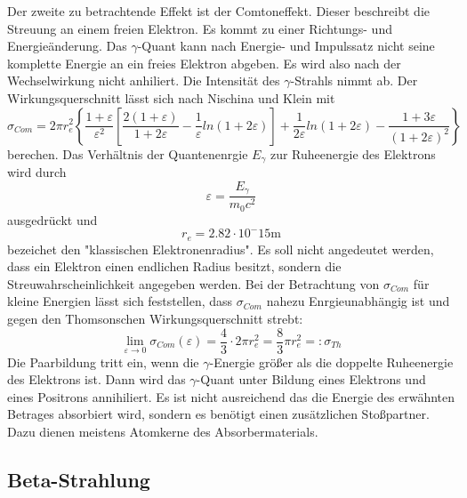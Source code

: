 Der zweite zu betrachtende Effekt ist der Comtoneffekt.
Dieser beschreibt die Streuung an einem freien Elektron.
Es kommt zu einer Richtungs- und Energieänderung.
Das $\gamma$-Quant kann nach Energie- und Impulssatz nicht seine komplette Energie an ein freies Elektron abgeben.
Es wird also nach der Wechselwirkung nicht anhiliert.
Die Intensität des $\gamma$-Strahls nimmt ab.
Der Wirkungsquerschnitt lässt sich nach Nischina und Klein mit
\begin{equation}
  \sigma_{Com} = 2 \pi r_e^2 \left\{\frac{1+\varepsilon}{\varepsilon^2}\left[\frac{2(1+\varepsilon)}{1+2\varepsilon} - \frac{1}{\varepsilon}ln(1+2\varepsilon)\right] + \frac{1}{2\varepsilon}ln(1+2\varepsilon) - \frac{1+3\varepsilon}{(1+2\varepsilon)^2} \right\}
\end{equation}
berechen.
Das Verhältnis der Quantenenrgie $E_\gamma$ zur Ruheenergie des Elektrons wird durch
\begin{equation}
  \varepsilon = \frac{E_\gamma}{m_0 c^2}
\end{equation}
ausgedrückt und
\begin{equation}
  r_e= 2.82 \cdot 10^-15 \si{\meter}
\end{equation}
bezeichet den "klassischen Elektronenradius".
Es soll nicht angedeutet werden, dass ein Elektron einen endlichen Radius besitzt, sondern die Streuwahrscheinlichkeit angegeben werden.
Bei der Betrachtung von $\sigma_{Com}$ für kleine Energien lässt sich feststellen, dass $\sigma_{Com}$ nahezu Enrgieunabhängig ist und gegen den Thomsonschen Wirkungsquerschnitt strebt:
\begin{equation}
  \lim_{\varepsilon \rightarrow 0} \sigma_{Com}(\varepsilon) = \frac{4}{3} \cdot 2 \pi r_e^2 = \frac{8}{3}\pi r_e^2 =: \sigma_{Th}
\end{equation}
Die Paarbildung tritt ein, wenn die $\gamma$-Energie größer als die doppelte Ruheenergie des Elektrons ist.
Dann wird das $\gamma$-Quant unter Bildung eines Elektrons und eines Positrons annihiliert.
Es ist nicht ausreichend das die Energie des erwähnten Betrages absorbiert wird, sondern es benötigt einen zusätzlichen Stoßpartner.
Dazu dienen meistens Atomkerne des Absorbermaterials.
\subsection{Beta-Strahlung}
